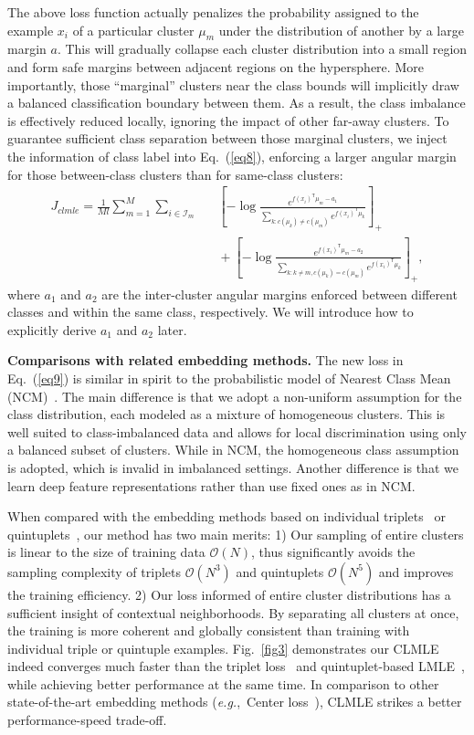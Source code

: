 \documentclass[10pt,journal,compsoc]{IEEEtran}
\newcommand{\eg}{\emph{e.g.}}
\newcommand{\trans}[1]{{#1}^{\ensuremath{\mathsf{T}}}} %
\begin{document}
The above loss function actually penalizes the probability assigned to the example $x_i$ of a particular cluster $\mu_m$ under the distribution of another by a large margin $a$. This will gradually collapse each cluster distribution into a small region and form safe margins between adjacent regions on the hypersphere. More importantly, those ``marginal'' clusters near the class bounds will implicitly draw a balanced classification boundary between them. As a result, the class imbalance is effectively reduced locally, ignoring the impact of other far-away clusters. To guarantee sufficient class separation between those marginal clusters, we inject the information of class label into Eq.~(\ref{eq8}), enforcing a larger angular margin for those between-class clusters than for same-class clusters:
\begin{eqnarray}
\label{eq9}
 J_{clmle} = \frac{1}{Ml} \sum_{m=1}^M \sum_{i \in \mathcal{I}_m} && \!\!\!\!\!\!\!\!\!\! \left[ -\log \frac{e^{\trans{f(x_i)} \mu_m - a_1}} {\sum_{k:c(\mu_k) \ne c(\mu_m)} e^{\trans{f(x_i)} \mu_k}} \right]_+ \nonumber\\
&& \!\!\!\!\!\!\!\!\!\!\!\!\!\!\!\!\!\!\!\!\!\!\!\!\!\!\!\!\!\!\!\!\!\!\!\!\!\!\!\! + \left[ -\log \frac{e^{\trans{f(x_i)} \mu_m - a_2}} {\sum_{k: k\ne m, c(\mu_k) = c(\mu_m)} e^{\trans{f(x_i)} \mu_k}} \right]_+,
\end{eqnarray}
where $a_1$ and $a_2$ are the inter-cluster angular margins enforced between different classes and within the same class, respectively. We will introduce how to explicitly derive $a_1$ and $a_2$ later.

\noindent
{\bf Comparisons with related embedding methods.} The new loss in Eq.~(\ref{eq9}) is similar in spirit to the probabilistic model of Nearest Class Mean (NCM)~\cite{Mensink2013}. The main difference is that we adopt a non-uniform assumption for the class distribution, each modeled as a mixture of homogeneous clusters. This is well suited to class-imbalanced data and allows for local discrimination using only a balanced subset of clusters. While in NCM, the homogeneous class assumption is adopted, which is invalid in imbalanced settings. Another difference is that we learn deep feature representations rather than use fixed ones as in NCM.

When compared with the embedding methods based on individual triplets~\cite{Schroff15} or quintuplets~\cite{huang2016lmle}, our method has two main merits: 1) Our sampling of entire clusters is linear to the size of training data $\mathcal{O}(N)$, thus significantly avoids the sampling complexity of triplets $\mathcal{O}(N^3)$ and quintuplets $\mathcal{O}(N^5)$ and improves the training efficiency. 2) Our loss informed of entire cluster distributions has a sufficient insight of contextual neighborhoods. By separating all clusters at once, the training is more coherent and globally consistent than training with individual triple or quintuple examples. Fig.~\ref{fig3} demonstrates our CLMLE indeed converges much faster than the triplet loss~\cite{Schroff15} and quintuplet-based LMLE~\cite{huang2016lmle}, while achieving better performance at the same time. In comparison to other state-of-the-art embedding methods (\eg,~Center loss~\cite{wen2016}), CLMLE strikes a better performance-speed trade-off.
\end{document}
